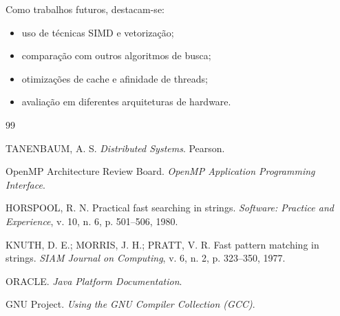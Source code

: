 \documentclass[10pt,twocolumn,a4paper]{article}
\begin{document}
Como trabalhos futuros, destacam-se:

\begin{itemize}
    \item uso de técnicas SIMD e vetorização;
    \item comparação com outros algoritmos de busca;
    \item otimizações de cache e afinidade de threads;
    \item avaliação em diferentes arquiteturas de hardware.
\end{itemize}

\begin{thebibliography}{99}

TANENBAUM, A. S.
\textit{Distributed Systems}. Pearson.

OpenMP Architecture Review Board.
\textit{OpenMP Application Programming Interface}.

HORSPOOL, R. N.
Practical fast searching in strings.
\textit{Software: Practice and Experience}, v. 10, n. 6, p. 501--506, 1980.

KNUTH, D. E.; MORRIS, J. H.; PRATT, V. R.
Fast pattern matching in strings.
\textit{SIAM Journal on Computing}, v. 6, n. 2, p. 323--350, 1977.

ORACLE.
\textit{Java Platform Documentation}.

GNU Project.
\textit{Using the GNU Compiler Collection (GCC)}.

\end{thebibliography}
\end{document}
